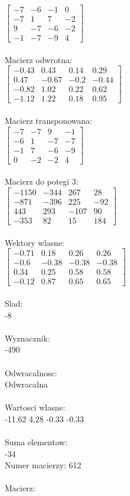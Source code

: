 \documentclass[a4paper,12pt]{article}
\begin{document}
$\begin{bmatrix} -7&-6&-1&0\\-7&1&7&-2\\9&-7&-6&-2\\-1&-7&-9&4 \end{bmatrix}$
\\
\\
Macierz odwrotna:\\

$\begin{bmatrix} -0.43&0.43&0.14&0.29\\0.47&-0.67&-0.2&-0.44\\-0.82&1.02&0.22&0.62\\-1.12&1.22&0.18&0.95 \end{bmatrix}$
\\
\\
Macierz transponowana:\\

$\begin{bmatrix} -7&-7&9&-1\\-6&1&-7&-7\\-1&7&-6&-9\\0&-2&-2&4 \end{bmatrix}$
\\
\\
Macierz do potegi 3:\\

$\begin{bmatrix} -1150&-344&267&28\\-871&-396&225&-92\\443&293&-107&90\\-353&82&15&184 \end{bmatrix}$
\\
\\
Wektory wlasne:\\

$\begin{bmatrix} -0.71&0.18&0.26&0.26\\-0.6&-0.38&-0.38&-0.38\\0.34&0.25&0.58&0.58\\-0.12&0.87&0.65&0.65 \end{bmatrix}$
\\
\\
Slad:\\
-8
\\
\\
Wyznacznik:\\
-490
\\
\\
Odwracalnosc:\\
Odwracalna
\\
\\
Wartosci wlasne:\\
-11.62 4.28 -0.33 -0.33
\\
\\
Suma elementow:\\
-34
\\
\newpage
Numer macierzy:
612
\\
\\
Macierz:\\
\end{document}
